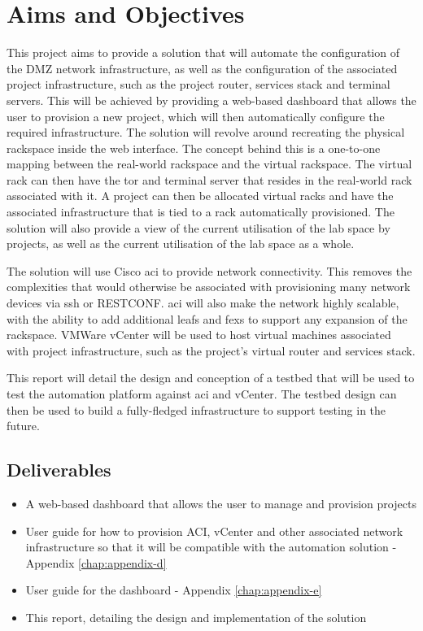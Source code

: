 \section{Aims and Objectives}
\label{intro:aims}

This project aims to provide
a solution that will automate the
configuration of the DMZ network
infrastructure, as well as the configuration of the associated project
infrastructure, such as the project router, services stack and terminal
servers. This will be achieved by providing a web-based dashboard that allows
the user to provision a new project, which will then automatically configure
the required infrastructure. The solution will revolve around recreating the
physical rackspace inside the web interface. The concept behind this is a
one-to-one mapping between the real-world rackspace and the virtual rackspace.
The virtual rack can then have the \gls{tor} and terminal server that resides
in the real-world rack associated with it. A project can then be allocated
virtual racks and have the associated infrastructure that is tied to a rack
automatically provisioned. The solution will also provide a view of the current
utilisation of the lab space by projects, as well as the current utilisation of
the lab space as a whole.

The solution will use Cisco \gls{aci} to provide
network connectivity. This removes the complexities that would otherwise be
associated with provisioning many network devices via \gls{ssh} or RESTCONF.
\gls{aci} will also make the network highly scalable, with the ability to add
additional leafs and \gls{fex}s to support any expansion of the rackspace.
VMWare vCenter will be used to host virtual machines associated with project
infrastructure, such as the project's virtual router and services stack.

This
report will detail the design and conception of a testbed that will be used to
test the automation platform against \gls{aci} and vCenter. The testbed design
can then be used to build a fully-fledged infrastructure to support testing in
the future.
\subsection{Deliverables}
\label{intro:aims:deliverables}

\begin{itemize}
      \item A web-based dashboard that allows the user to manage
            and provision projects
            
      \item User guide for how to provision ACI, vCenter and other associated
            network infrastructure so that it will be compatible with the automation
            solution - Appendix \ref{chap:appendix-d}
            
      \item User guide for the dashboard - Appendix \ref{chap:appendix-e}
            
      \item This report, detailing the design and implementation of the
            solution
\end{itemize}

